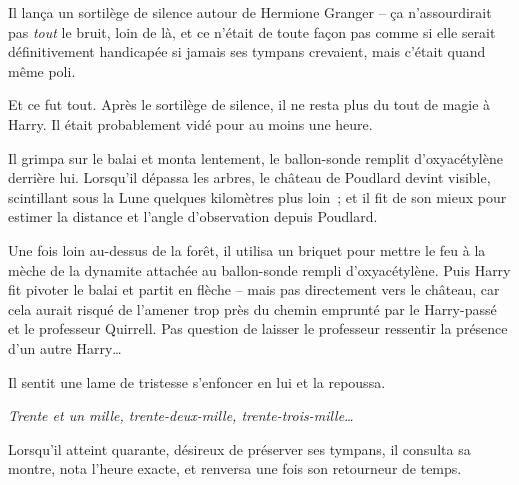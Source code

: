 Il lança un sortilège de silence autour de Hermione Granger -- ça n'assourdirait pas \emph{tout} le bruit, loin de là, et ce n'était de toute façon pas comme si elle serait définitivement handicapée si jamais ses tympans crevaient, mais c'était quand même poli.

Et ce fut tout. Après le sortilège de silence, il ne resta plus du tout de magie à Harry. Il était probablement vidé pour au moins une heure.

Il grimpa sur le balai et monta lentement, le ballon-sonde remplit d'oxyacétylène derrière lui. Lorsqu'il dépassa les arbres, le château de Poudlard devint visible, scintillant sous la Lune quelques kilomètres plus loin~; et il fit de son mieux pour estimer la distance et l'angle d'observation depuis Poudlard.

Une fois loin au-dessus de la forêt, il utilisa un briquet pour mettre le feu à la mèche de la dynamite attachée au ballon-sonde rempli d'oxyacétylène. Puis Harry fit pivoter le balai et partit en flèche -- mais pas directement vers le château, car cela aurait risqué de l'amener trop près du chemin emprunté par le Harry-passé et le professeur Quirrell. Pas question de laisser le professeur ressentir la présence d'un autre Harry…

Il sentit une lame de tristesse s'enfoncer en lui et la repoussa.

\emph{Trente et un mille, trente-deux-mille, trente-trois-mille…}

Lorsqu'il atteint quarante, désireux de préserver ses tympans, il consulta sa montre, nota l'heure exacte, et renversa une fois son retourneur de temps.
